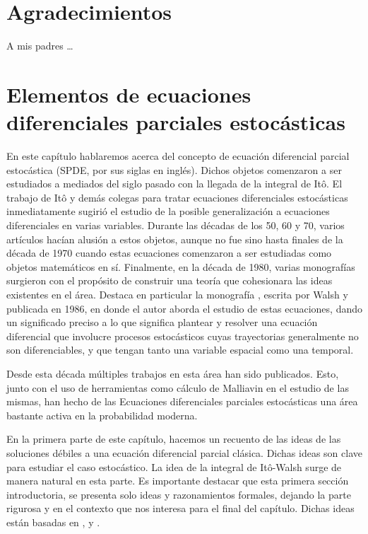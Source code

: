 \documentclass[letterpaper,twoside,12pt]{book}
\newcommand{\1}{\mathds{1}}
\theoremstyle{definition}
\theoremstyle{definition}
\theoremstyle{remark}
\theoremstyle{definition}
\theoremstyle{definition}
\theoremstyle{definition}
\theoremstyle{definition}
\theoremstyle{definition}
\begin{document}
\chapter*{Agradecimientos}

A mis padres \ldots

\tableofcontents







\mainmatter

\chapter{Elementos de ecuaciones diferenciales parciales estocásticas}

En este capítulo hablaremos acerca del concepto de ecuación diferencial parcial estocástica (SPDE, por sus siglas en inglés).
Dichos objetos comenzaron a ser estudiados a mediados del siglo pasado con la llegada de la integral de Itô.
El trabajo de Itô y demás colegas para tratar ecuaciones diferenciales estocásticas inmediatamente sugirió el estudio de la posible generalización a ecuaciones diferenciales en varias variables.
Durante las décadas de los 50, 60 y 70, varios artículos hacían alusión a estos objetos, aunque no fue sino hasta finales de la década de 1970 cuando estas ecuaciones comenzaron a ser estudiadas como objetos matemáticos en sí.
Finalmente, en la década de 1980, varias monografías surgieron con el propósito de construir una teoría que cohesionara las ideas existentes en el área. Destaca en particular la monografía \cite{Walsh_J.B_Introduction_to_SPDEs}, escrita por Walsh  y publicada en 1986, en donde el autor aborda el estudio de estas ecuaciones, dando un significado preciso a lo que significa plantear y resolver una ecuación diferencial que involucre procesos estocásticos cuyas trayectorias generalmente no son diferenciables, y que tengan tanto una variable espacial como una temporal.

Desde esta década múltiples trabajos en esta área han sido publicados. Esto, junto con el uso de herramientas como cálculo de Malliavin en el estudio de las mismas, han hecho de las Ecuaciones diferenciales parciales estocásticas una área bastante activa en la probabilidad moderna.

En la primera parte de este capítulo, hacemos un recuento de las ideas de las soluciones débiles a una ecuación diferencial parcial clásica. Dichas ideas son clave para estudiar el caso estocástico. La idea de la integral de Itô-Walsh surge de manera natural en esta parte. Es importante destacar que esta primera sección introductoria, se presenta solo ideas y razonamientos formales, dejando la parte rigurosa y en el contexto que nos interesa para el final del capítulo. Dichas ideas están basadas en \cite{evans2010partial}, \cite{BonderEcuaciones} y \cite{Khoshnevisan2009}.
\end{document}
